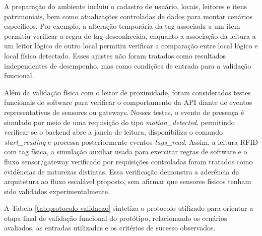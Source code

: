 A preparação do ambiente incluiu o cadastro de usuário, locais, leitores e itens patrimoniais, bem como atualizações controladas de dados para montar cenários específicos. Por exemplo, a alteração temporária da tag associada a um item permitiu verificar a regra de tag desconhecida, enquanto a associação da leitura a um leitor lógico de outro local permitiu verificar a comparação entre local lógico e local físico detectado. Esses ajustes não foram tratados como resultados independentes de desempenho, mas como condições de entrada para a validação funcional.

Além da validação física com o leitor de proximidade, foram considerados testes funcionais de software para verificar o comportamento da API diante de eventos representativos de sensores ou gateways. Nesses testes, o evento de presença é simulado por meio de uma requisição do tipo \textit{motion\_detected}, permitindo verificar se o backend abre a janela de leitura, disponibiliza o comando \textit{start\_reading} e processa posteriormente eventos \textit{tags\_read}. Assim, a leitura RFID com tag física, a simulação auxiliar usada para exercitar regras de software e o fluxo sensor/gateway verificado por requisições controladas foram tratados como evidências de naturezas distintas. Essa verificação demonstra a aderência da arquitetura ao fluxo escalável proposto, sem afirmar que sensores físicos tenham sido validados experimentalmente.

A Tabela \ref{tab:protocolo-validacao} sintetiza o protocolo utilizado para orientar a etapa final de validação funcional do protótipo, relacionando os cenários avaliados, as entradas utilizadas e os critérios de sucesso observados.

